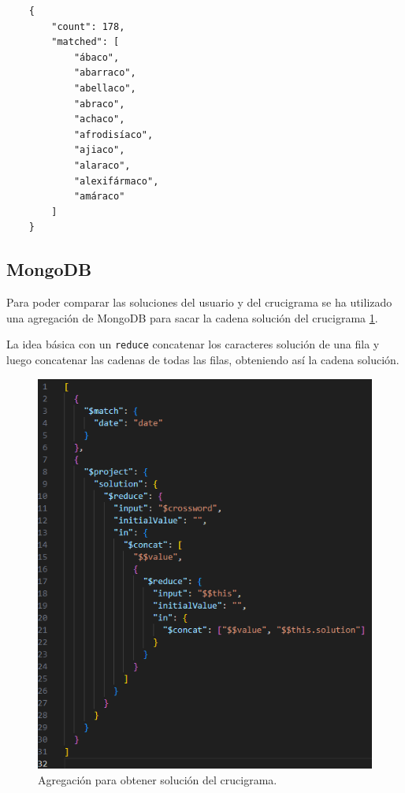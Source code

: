 \documentclass[12pt, a4paper]{article}
\begin{document}
\begin{verbatim}
	{
		"count": 178,
		"matched": [
			"ábaco",
			"abarraco",
			"abellaco",
			"abraco",
			"achaco",
			"afrodisíaco",
			"ajiaco",
			"alaraco",
			"alexifármaco",
			"amáraco"
		]
	}
\end{verbatim}


\subsection{MongoDB}

Para poder comparar las soluciones del usuario y del crucigrama se ha
utilizado una agregación de MongoDB para sacar la cadena solución del
crucigrama \ref{fig:reducequery}.

La idea básica con un \verb*|reduce| concatenar los caracteres solución de una fila
y luego concatenar las cadenas de todas las filas, obteniendo así la cadena solución.

\begin{figure}[h!]
	\centering
	\includegraphics[width=\linewidth]{img/reduceQuery}
	\caption{Agregación para obtener solución del crucigrama.}
	\label{fig:reducequery}
\end{figure}
\end{document}
